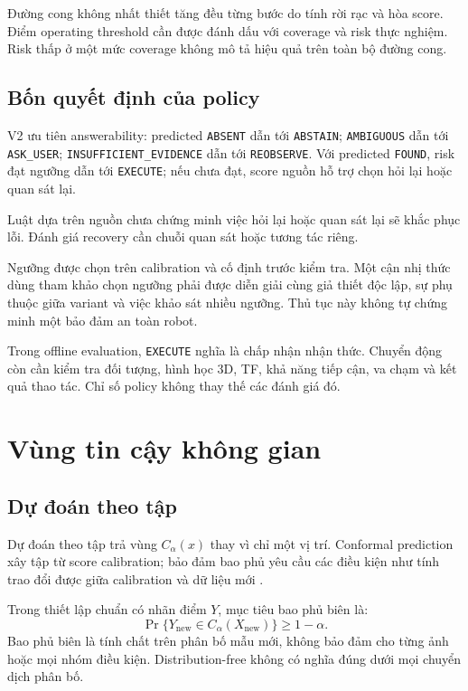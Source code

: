 Đường cong không nhất thiết tăng đều từng bước do tính rời rạc và hòa score. Điểm operating threshold cần được đánh dấu với coverage và risk thực nghiệm. Risk thấp ở một mức coverage không mô tả hiệu quả trên toàn bộ đường cong.

\subsection{Bốn quyết định của policy}

V2 ưu tiên answerability: predicted \texttt{ABSENT} dẫn tới \texttt{ABSTAIN}; \texttt{AMBIGUOUS} dẫn tới \texttt{ASK\_USER}; \texttt{INSUFFICIENT\_EVIDENCE} dẫn tới \texttt{REOBSERVE}. Với predicted \texttt{FOUND}, risk đạt ngưỡng dẫn tới \texttt{EXECUTE}; nếu chưa đạt, score nguồn hỗ trợ chọn hỏi lại hoặc quan sát lại.

Luật dựa trên nguồn chưa chứng minh việc hỏi lại hoặc quan sát lại sẽ khắc phục lỗi. Đánh giá recovery cần chuỗi quan sát hoặc tương tác riêng.

Ngưỡng được chọn trên calibration và cố định trước kiểm tra. Một cận nhị thức dùng tham khảo chọn ngưỡng phải được diễn giải cùng giả thiết độc lập, sự phụ thuộc giữa variant và việc khảo sát nhiều ngưỡng. Thủ tục này không tự chứng minh một bảo đảm an toàn robot.

Trong offline evaluation, \texttt{EXECUTE} nghĩa là chấp nhận nhận thức. Chuyển động còn cần kiểm tra đối tượng, hình học 3D, TF, khả năng tiếp cận, va chạm và kết quả thao tác. Chỉ số policy không thay thế các đánh giá đó.

\section{Vùng tin cậy không gian}
\label{sec:theory-conformal}

\subsection{Dự đoán theo tập}

Dự đoán theo tập trả vùng $C_\alpha(x)$ thay vì chỉ một vị trí. Conformal prediction xây tập từ score calibration; bảo đảm bao phủ yêu cầu các điều kiện như tính trao đổi được giữa calibration và dữ liệu mới \cite{angelopoulos2021conformal}.

Trong thiết lập chuẩn có nhãn điểm $Y$, mục tiêu bao phủ biên là:
\begin{equation}
    \Pr\{Y_{\mathrm{new}}\in C_\alpha(X_{\mathrm{new}})\}
    \geq1-\alpha.
    \label{eq:theory-conformal-point}
\end{equation}
Bao phủ biên là tính chất trên phân bố mẫu mới, không bảo đảm cho từng ảnh hoặc mọi nhóm điều kiện. Distribution-free không có nghĩa đúng dưới mọi chuyển dịch phân bố.


